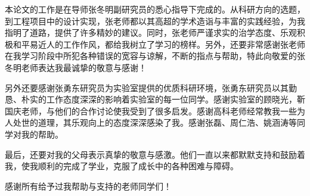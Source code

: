 
\begin{thanks}

本论文的工作是在导师张冬明副研究员的悉心指导下完成的。从科研方向的选题，到工程项目中的设计实现，张老师都以其高超的学术造诣与丰富的实践经验，为我指明了道路，提供了许多精妙的建议。同时，张老师严谨求实的治学态度、乐观积极和平易近人的工作作风，都给我树立了学习的榜样。另外，还要非常感谢张老师在我学习阶段中所犯各种错误的宽容与谅解，不断的指点与帮助，特此向敬爱的张冬明老师表达我最诚挚的敬意与感谢！

另外还要感谢张勇东研究员为实验室提供的优质科研环境，张勇东研究员以其勤恳、朴实的工作态度深深的影响着实验室的每一位同学。感谢实验室的顾晓光，靳国庆老师，与他们的合作讨论使我受到了很多启发。感谢高科老师经常教我一些为人处世的道理，其乐观向上的态度深深感染了我。感谢张磊、周仁浩、姚涵涛等同学对我的帮助。

最后，还要对我的父母表示真挚的敬意与感激。他们一直以来都默默支持和鼓励着我，使我顺利的完成了学业，克服了成长中的各种困难与障碍。

感谢所有给予过我帮助与支持的老师同学们！

\end{thanks}
